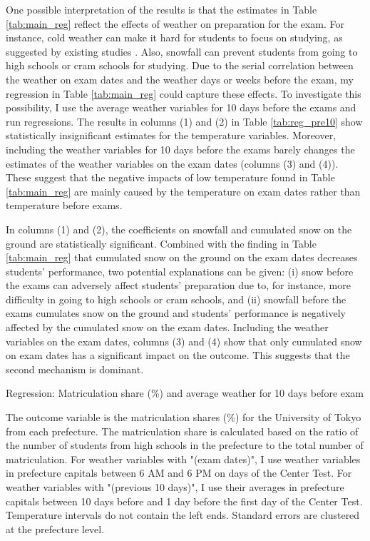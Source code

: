 \documentclass[12pt,letterpaper]{article}
\begin{document}
One possible interpretation of the results is that the estimates in Table \ref{tab:main_reg} reflect the effects of weather on preparation for the exam.
For instance, cold weather can make it hard for students to focus on studying, as suggested by existing studies \citep{Taylor2016}.
Also, snowfall can prevent students from going to high schools or cram schools for studying.
Due to the serial correlation between the weather on exam dates and the weather days or weeks before the exam, my regression in Table \ref{tab:main_reg} could capture these effects.
To investigate this possibility, I use the average weather variables for 10 days before the exams and run regressions.
The results in columns (1) and (2) in Table \ref{tab:reg_pre10} show statistically insignificant estimates for the temperature variables.
Moreover, including the weather variables for 10 days before the exams barely changes the estimates of the weather variables on the exam dates (columns (3) and (4)).
These suggest that the negative impacts of low temperature found in Table \ref{tab:main_reg} are mainly caused by the temperature on exam dates rather than temperature before exams.

In columns (1) and (2), the coefficients on snowfall and cumulated snow on the ground are statistically significant.
Combined with the finding in Table \ref{tab:main_reg} that cumulated snow on the ground on the exam dates decreases students' performance, two potential explanations can be given:
(i) snow before the exams can adversely affect students' preparation due to, for instance, more difficulty in going to high schools or cram schools, and
(ii) snowfall before the exams cumulates snow on the ground and students' performance is negatively affected by the cumulated snow on the exam dates.
Including the weather variables on the exam dates, columns (3) and (4) show that only cumulated snow on exam dates has a significant impact on the outcome.
This suggests that the second mechanism is dominant.

\begin{table}[H]
  \center
  \caption{Regression: Matriculation share (\%) and average weather for 10 days before exam}
  \scriptsize
  
  \label{tab:reg_pre10}
  \scriptsize
  \begin{tablenotes}
    \item
      The outcome variable is the matriculation shares (\%) for the University of Tokyo from each prefecture.
      The matriculation share is calculated based on the ratio of the number of students from high schools in the prefecture to the total number of matriculation.
      For weather variables with "(exam dates)", I use weather variables in prefecture capitals between 6 AM and 6 PM on days of the Center Test.
      For weather variables with "(previous 10 days)", I use their averages in prefecture capitals between 10 days before and 1 day before the first day of the Center Test.
      Temperature intervals do not contain the left ends.
      Standard errors are clustered at the prefecture level.
  \end{tablenotes}
\end{table}
\end{document}
